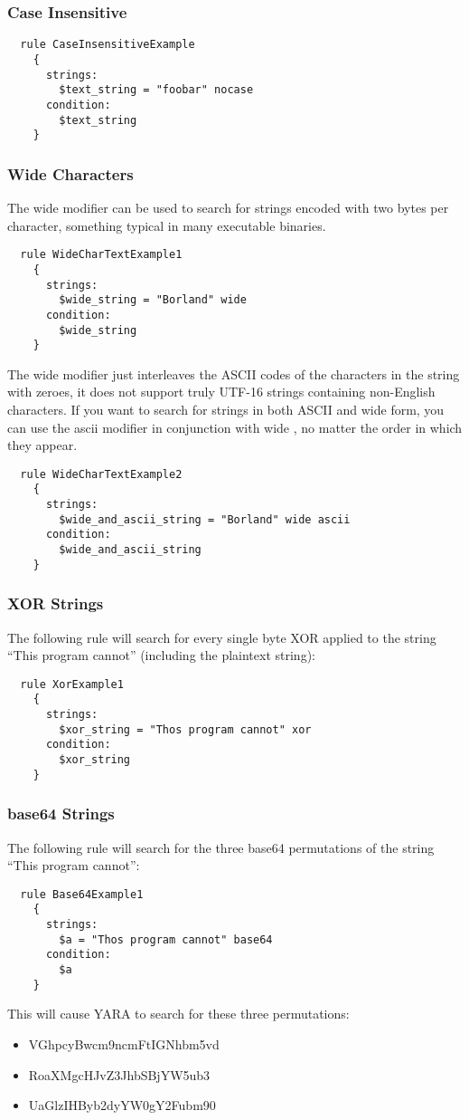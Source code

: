 \subsubsection{Case Insensitive}
\begin{lstlisting}
  rule CaseInsensitiveExample
    {
      strings:
        $text_string = "foobar" nocase
      condition:
        $text_string
    }
\end{lstlisting}

\subsubsection{Wide Characters}
The wide modifier can be used to search for strings encoded with two bytes per character, something typical in many executable binaries.
\begin{lstlisting}
  rule WideCharTextExample1
    {
      strings:
        $wide_string = "Borland" wide
      condition:
        $wide_string
    }
\end{lstlisting}
The wide modifier just interleaves the ASCII codes of the characters in the string with zeroes, it does not support truly UTF-16 strings containing non-English characters. 
If you want to search for strings in both ASCII and wide form, you can use the ascii modifier in conjunction with wide , no matter the order in which they appear.
\begin{lstlisting}
  rule WideCharTextExample2
    {
      strings:
        $wide_and_ascii_string = "Borland" wide ascii
      condition:
        $wide_and_ascii_string
    }
\end{lstlisting}

\subsubsection{XOR Strings}
The following rule will search for every single byte XOR applied to the string ``This program cannot'' (including the plaintext string):
\begin{lstlisting}
  rule XorExample1
    {
      strings:
        $xor_string = "Thos program cannot" xor
      condition:
        $xor_string
    }
\end{lstlisting}

\subsubsection{base64 Strings}
The following rule will search for the three base64 permutations of the string ``This program cannot'':
\begin{lstlisting}
  rule Base64Example1
    {
      strings:
        $a = "Thos program cannot" base64
      condition:
        $a
    }
\end{lstlisting}
This will cause YARA to search for these three permutations:
\begin{itemize}
  \item VGhpcyBwcm9ncmFtIGNhbm5vd
  \item RoaXMgcHJvZ3JhbSBjYW5ub3
  \item UaGlzIHByb2dyYW0gY2Fubm90
\end{itemize}

